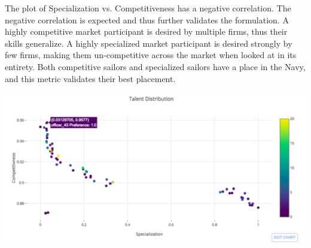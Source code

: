 The plot of Specialization vs. Competitiveness has a negative correlation. The negative correlation is expected and thus further validates the formulation.  A highly competitive market participant is desired by multiple firms, thus their skills generalize. A highly specialized market participant is desired strongly by few firms, making them un-competitive across the market when looked at in its entirety. Both competitive sailors and specialized sailors have a place in the Navy, and this metric validates their best placement. 

\begin{center}
\includegraphics[scale=0.75]{Sections/figures/med_comp_v_spec.png}
\end{center}

